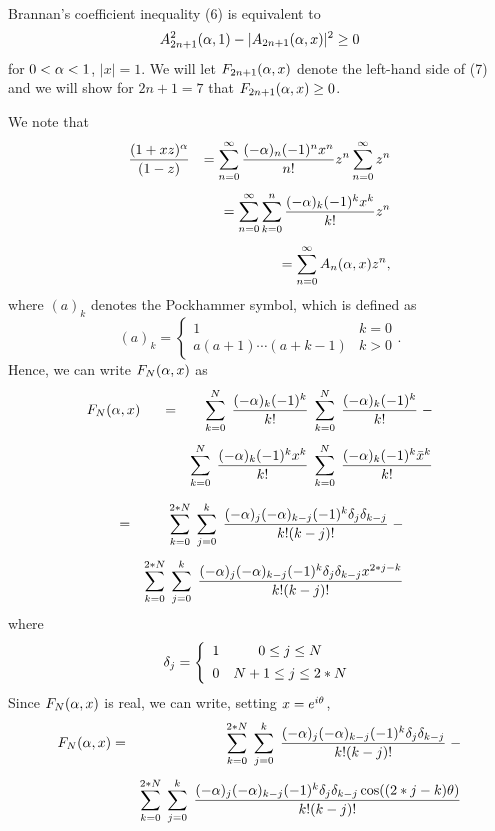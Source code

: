 \\

Brannan's coefficient inequality (6) is equivalent to
\begin{equation}
\label{7}
A^2_{2n+1}(\alpha,1)-|A_{2n+1}(\alpha,x)|^2\geq 0
\end{equation}
for $0<\alpha<1$, $|x|=1$.  We will let $F_{2n+1}(\alpha,x)$ denote the
left-hand side of (7) and we will show for $2{n+1}=7$ that
$F_{2n+1}(\alpha,x)\geq 0$.

We note that
\begin{eqnarray*}
& \displaystyle{\frac{(1+xz)^\alpha}{(1-z)}} & =\sum^\infty_{n=0} 
\frac{(-\alpha)_n(-1)^nx^n}{n!}z^n\sum^\infty_{n=0}z^n\\[1ex]
&& =\sum^\infty_{n=0}\sum^n_{k=0}\frac{(-\alpha)_k(-1)^kx^k}{k!}z^n\\[1ex]
&& =\sum^\infty_{n=0}A_n(\alpha,x)z^n,
\end{eqnarray*}
where $(a)_k$ denotes the Pockhammer symbol, which is defined as
$$
(a)_k=\left\{ \begin{array}{cl} 1 & k=0\\[1ex] a(a+1)\cdots(a+k-1) &
k>0\end{array}\right. .
$$
Hence, we can write $F_N(\alpha,x)$ as
\begin{eqnarray*}
F_N(\a,x)\indent & = & \sum^N_{k=0}\; \frac{(-\a)_k(-1)^k}{k!}\;
\sum^N_{k=0}\; \frac{(-\a)_k(-1)^k}{k!}\; -\\[1ex]
&& \sum^N_{k=0}\; \frac{(-\a)_k(-1)^kx^k}{k!}\; \sum^N_{k=0}\; 
\frac{(-\a)_k(-1)^k\bar{x}^k}{k!}
\end{eqnarray*}

\newpage

\begin{eqnarray*}
& = & \sum^{2*N}_{k=0}\; \sum^k_{j=0}\; 
\frac{(-\alpha)_j(-\alpha)_{k-j}(-1)^k\delta_j\delta_{k-j}}{k!(k-j)!}\; -\\[1ex]
&& \sum^{2*N}_{k=0}\; \sum^k_{j=0}\;
\frac{(-\alpha)_j(-\alpha)_{k-j}(-1)^k\delta_j\delta_{k-j}x^{2*j-k}}{k!(k-j)!}
\end{eqnarray*}
where
$$
\delta_j=\left\{ \begin{array}{lc} 1 & 0\leq j\leq N\\[1ex] 
0 & N+1\leq j\leq 2*N\end{array}\right.
$$
Since $F_N(\alpha,x)$ is real, we can write, setting $x=e^{i\theta}$, 
\begin{eqnarray}
\nonumber
F_N(\alpha,x) & = & \sum^{2*N}_{k=0}\; \sum^k_{j=0}\; 
\frac{(-\alpha)_j(-\alpha)_{k-j}(-1)^k\delta_j\delta_{k-j}}{k!(k-j)!}\; -\\[1ex]
\label{8}
&& \sum^{2*N}_{k=0}\; \sum^k_{j=0}\;
\frac{(-\alpha)_j(-\alpha)_{k-j}(-1)^k\delta_j\delta_{k-j}\cos((2*j-k)\theta)}{k!(k-j)!}
\end{eqnarray}

